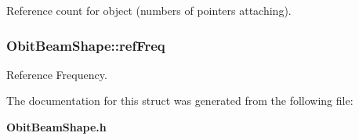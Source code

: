 Reference count for object (numbers of pointers attaching). 

\subsubsection{ {\bf Obit\-Beam\-Shape::ref\-Freq}}\label{structObitBeamShape_o7}


Reference Frequency. 



The documentation for this struct was generated from the following file:\begin{CompactItemize}
\item 
{\bf Obit\-Beam\-Shape.h}\end{CompactItemize}

